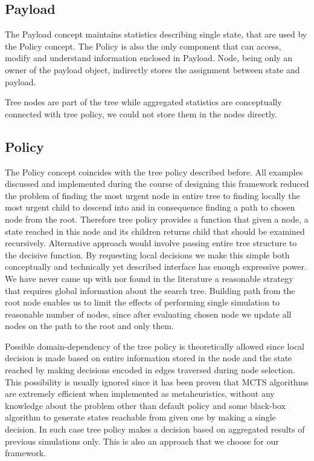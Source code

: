 \subsection{Payload}
The Payload concept maintains statistics describing single state, that are used
by the Policy concept. The Policy is also the only component that can access, modify
and understand information enclosed in Payload. Node, being only an owner of
the payload object, indirectly stores the assignment between state and payload.

Tree nodes are part of the tree while aggregated statistics are conceptually
connected with tree policy, we could not store them in the nodes directly.

\subsection{Policy}
The Policy concept coincides with the tree policy described before.
All examples discussed and implemented during the course of designing this
framework reduced the problem of finding the most urgent node in entire tree to
finding locally the most urgent child to descend into and in consequence
finding a path to chosen node from the root. Therefore tree policy provides a
function that given a node, a state reached in this node and its children
returns child that should be examined recursively. Alternative approach would
involve passing entire tree structure to the decisive function. By requesting
local decisions we make this simple both conceptually and technically yet
described interface has enough expressive power. We have never came up with nor
found in the literature a reasonable strategy that requires global information
about the search tree.
Building path from the root node enables us to limit the effects of performing
single simulation to reasonable number of nodes, since after evaluating chosen
node we update all nodes on the path to the root and only them.

Possible domain-dependency of the tree policy is theoretically allowed since
local decision is made based on entire information stored in the node and the
state reached by making decisions encoded in edges traversed during node
selection.
This possibility is usually ignored since it has been proven that MCTS
algorithms are extremely efficient when implemented as metaheuristics, without
any knowledge about the problem other than default policy and some black-box
algorithm to generate states reachable from given one by making a single
decision. In such case tree policy makes a decision based on aggregated results
of previous simulations only.
This is also an approach that we choose for our framework.

